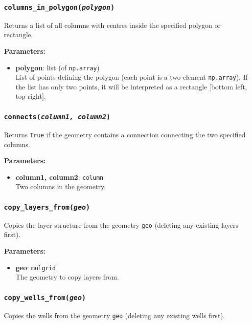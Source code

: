 \subsubsection{\texttt{columns\_in\_polygon(\emph{polygon})}}

Returns a list of all columns with centres inside the specified polygon or rectangle.

\textbf{Parameters:}
\begin{itemize}
\item \textbf{polygon}: list (of \texttt{np.array})\\
  List of points defining the polygon (each point is a two-element \texttt{np.array}).  If the list has only two points, it will be interpreted as a rectangle [bottom left, top right].
\end{itemize}

\subsubsection{\texttt{connects(\emph{column1, column2})}}

Returns \texttt{True} if the geometry contains a connection connecting the two specified columns.

\textbf{Parameters:}
\begin{itemize}
\item \textbf{column1, column2}: \texttt{column}\\
  Two columns in the geometry.
\end{itemize}

\subsubsection{\texttt{copy\_layers\_from(\emph{geo})}}

Copies the layer structure from the geometry \texttt{geo} (deleting any existing layers first).

\textbf{Parameters:}
\begin{itemize}
\item \textbf{geo}: \texttt{mulgrid}\\
  The geometry to copy layers from.
\end{itemize}

\subsubsection{\texttt{copy\_wells\_from(\emph{geo})}}

Copies the wells from the geometry \texttt{geo} (deleting any existing wells first).

